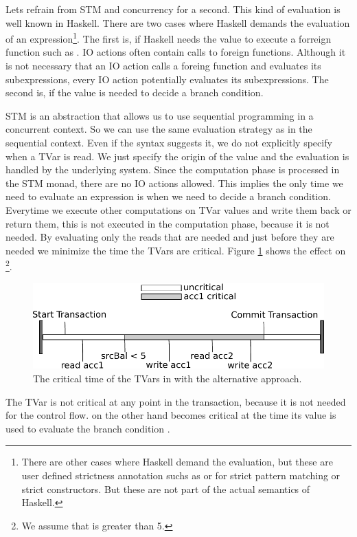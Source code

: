 Lets refrain from STM and concurrency for a second. This kind of evaluation is well known in Haskell. There 
are two cases where Haskell demands the evaluation of an expression\footnote{There are other cases where Haskell
demand the evaluation, but these are user defined strictness annotation suchs as  or \code{!} for strict 
pattern matching or strict constructors. But these are not part of the actual semantics of Haskell.}. 
The first is, if Haskell needs the value to execute a forreign function such as .
IO actions often contain calls to foreign functions. Although it is not necessary that an IO action calls a 
foreing function and evaluates its subexpressions, every IO action potentially evaluates its subexpressions. 
The second is, if the value is needed to decide a branch condition.

STM is an abstraction that allows us to use sequential programming in a concurrent context. So we can use the 
same evaluation strategy as in the sequential context. Even if the syntax suggests it, we do not explicitly
specify when a TVar is read. We just specify the origin of the value and the evaluation is handled by the 
underlying system. Since the computation phase is processed in the STM monad, there are no IO actions allowed.  
This implies the only time we need to evaluate an expression is when we need to decide a branch condition. 
Everytime we execute other computations on TVar values and write them back or return them, this is not executed 
in the computation phase, because it is not needed. 
By evaluating only the reads that are needed and just before they are needed we minimize the time the TVars are critical. 
Figure \ref{fig:lessCriticalValue} shows the effect on \footnote{We 
assume that  is greater than 5.}. 
\begin{figure}
\centering
\includegraphics{Figures/lessCriticalValue}
\decoRule
\caption[Less Critical Value]{The critical time of the TVars in  with the alternative approach.}
\label{fig:lessCriticalValue}
\end{figure}
The TVar  is not critical at any point in the transaction, because it is not needed for the control 
flow.  on the other hand becomes critical at the time its value is used to evaluate the branch
condition .

